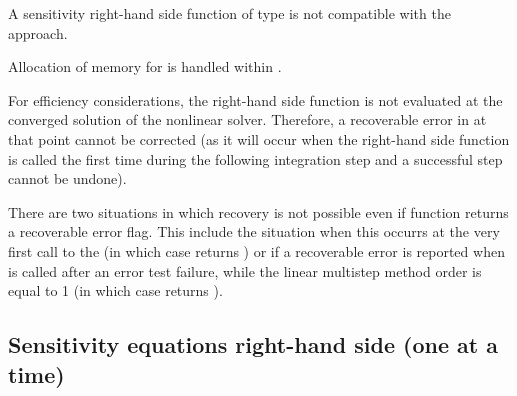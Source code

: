 {
  {\warn}A sensitivity right-hand side function of type  is not
  compatible with the  approach.

  Allocation of memory for  is handled within {\idas}.

  {\warn}For efficiency considerations, the right-hand side function is not
  evaluated at the converged solution of the nonlinear solver. Therefore, a
  recoverable error in  at that point cannot be corrected (as it will 
  occur when the right-hand side function is called the first time during the 
  following integration step and a successful step cannot be undone).

  There are two situations in which recovery is not possible even if 
  function returns a recoverable error flag. This include the situation when this
  occurrs at the very first call to the  (in which case {\idas} returns
  ) or if a recoverable error is reported when 
  is called after an error test failure, while the linear multistep method order is
  equal to 1 (in which case {\idas} returns ).
}

\subsection{Sensitivity equations right-hand side (one at a time)}
  
